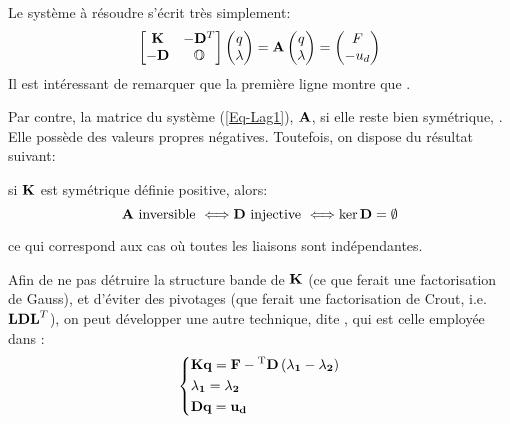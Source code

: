 Le système à résoudre s'écrit très simplement:
\begin{equation}\label{Eq-Lag1}
\begin{bmatrix} \mathbf{K} & -\mathbf{D}^T\\ -\mathbf{D} & \mathbb{O}{} \end{bmatrix}
\begin{pmatrix} q\\ \lambda \end{pmatrix} =
\mathbf{A}
\begin{pmatrix} q\\ \lambda \end{pmatrix} =
\begin{pmatrix} F\\ -u_d \end{pmatrix}
\end{equation}
Il est intéressant de remarquer que la première ligne montre que .

Par contre, la matrice du système (\ref{Eq-Lag1}), $\mathbf{A}$, si elle reste bien symétrique, . Elle possède des valeurs propres négatives.
\medskipvm
Toutefois, on dispose du résultat suivant:

\begin{theoreme}
si $\mathbf{K}$ est symétrique définie positive, alors:
\begin{equation}
\mathbf{A} \text{ inversible } \Longleftrightarrow \mathbf{D} \text{ injective } \Longleftrightarrow \ker \mathbf{D} = \emptyset
\end{equation}
\end{theoreme}
ce qui correspond aux cas où toutes les liaisons sont indépendantes.

\bigskipvm
Afin de ne pas détruire la structure bande de $\mathbf{K}$ (ce que ferait une factorisation de Gauss), 
et d'éviter des pivotages (que ferait une factorisation de Crout, i.e. $\mathbf{LDL}^T$), on peut développer une autre technique, dite , qui est celle employée dans \castem:
\begin{equation}
\left\{\begin{aligned}
&\mathbf{K}\mathbf{q} = \mathbf{F} - {}^\mathrm{T}\mathbf{D}\left(\mathbf{\lambda_1} - \mathbf{\lambda_2}\right) \\
&\mathbf{\lambda_1} = \mathbf{\lambda_2} \\ 
&\mathbf{D}\mathbf{q} = \mathbf{u_d}
\end{aligned}\right.
\end{equation}

